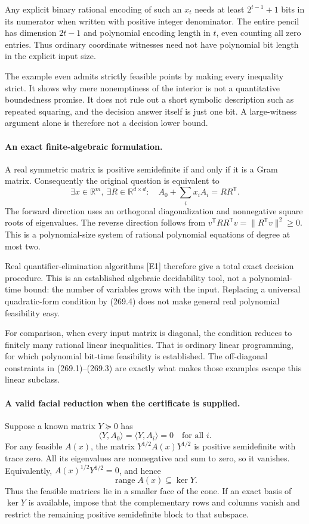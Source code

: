 \documentclass[11pt]{article}
\begin{document}
Any explicit binary rational encoding of such an $x_t$ needs at least $2^{t-1}+1$ bits in its numerator when written with positive integer denominator. The entire pencil has dimension $2t-1$ and polynomial encoding length in $t$, even counting all zero entries. Thus ordinary coordinate witnesses need not have polynomial bit length in the explicit input size.

The example even admits strictly feasible points by making every inequality strict. It shows why mere nonemptiness of the interior is not a quantitative boundedness promise. It does not rule out a short symbolic description such as repeated squaring, and the decision answer itself is just one bit. A large-witness argument alone is therefore not a decision lower bound.

\paragraph{An exact finite-algebraic formulation.}
A real symmetric matrix is positive semidefinite if and only if it is a Gram matrix. Consequently the original question is equivalent to
\[
 \exists x\in\mathbb R^m,\ \exists R\in\mathbb R^{d\times d}:
 \quad A_0+\sum_i x_iA_i=RR^{\mathsf T}.
 \tag{269.4}
\]
The forward direction uses an orthogonal diagonalization and nonnegative square roots of eigenvalues. The reverse direction follows from
$v^{\mathsf T}RR^{\mathsf T}v=\|R^{\mathsf T}v\|^2\ge0$.
This is a polynomial-size system of rational polynomial equations of degree at most two.

Real quantifier-elimination algorithms [E1] therefore give a total exact decision procedure. This is an established algebraic decidability tool, not a polynomial-time bound: the number of variables grows with the input. Replacing a universal quadratic-form condition by (269.4) does not make general real polynomial feasibility easy.

For comparison, when every input matrix is diagonal, the condition reduces to finitely many rational linear inequalities. That is ordinary linear programming, for which polynomial bit-time feasibility is established. The off-diagonal constraints in (269.1)--(269.3) are exactly what makes those examples escape this linear subclass.

\paragraph{A valid facial reduction when the certificate is supplied.}
Suppose a known matrix $Y\succeq0$ has
\[
 \langle Y,A_0\rangle=\langle Y,A_i\rangle=0
 \quad\text{for all }i.
\]
For any feasible $A(x)$, the matrix
$Y^{1/2}A(x)Y^{1/2}$ is positive semidefinite with trace zero. All its eigenvalues are nonnegative and sum to zero, so it vanishes. Equivalently,
$A(x)^{1/2}Y^{1/2}=0$, and hence
\[
 \operatorname{range} A(x)\subseteq\ker Y.
\]
Thus the feasible matrices lie in a smaller face of the cone. If an exact basis of $\ker Y$ is available, impose that the complementary rows and columns vanish and restrict the remaining positive semidefinite block to that subspace.
\end{document}
